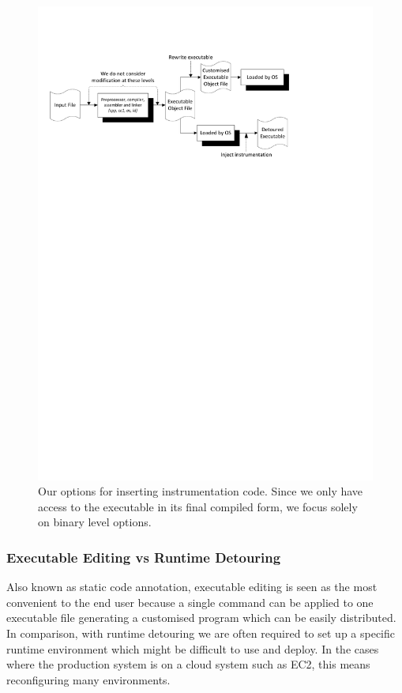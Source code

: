 \begin{figure}[H]
 \centering
 \includegraphics[viewport=21 566 448 757]{Detouring_Options.pdf}
 \caption[Detouring Options]{Our options for inserting instrumentation code. Since we only have access to the executable in its final compiled form, we focus solely on binary level options.}
\end{figure}

\subsubsection{Executable Editing vs Runtime Detouring}

Also known as static code annotation\cite{static_code_annotation}, executable editing is seen as the most convenient to the end user because a single command can be applied to one executable file generating a customised program which can be easily distributed. In comparison, with runtime detouring we are often required to set up a specific runtime environment which might be difficult to use and deploy. In the cases where the production system is on a cloud system such as EC2, this means reconfiguring many environments.

